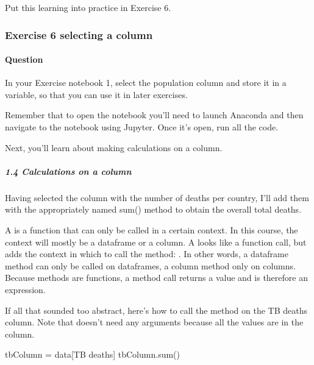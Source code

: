 \documentclass[letterpaper,10pt,english]{sphinxmanual}
\begin{document}
Put this learning into practice in Exercise 6.


\subsubsection{Exercise 6 selecting a column}
\label{\detokenize{content/session_02/Part_02_01:Exercise-6-selecting-a-column}}

\paragraph{Question}
\label{\detokenize{content/session_02/Part_02_01:id3}}
In your Exercise notebook 1, select the population column and store it in a variable, so that you can use it in later exercises.

Remember that to open the notebook you’ll need to launch Anaconda and then navigate to the notebook using Jupyter. Once it’s open, run all the code.

Next, you’ll learn about making calculations on a column.


\subparagraph{1.4 Calculations on a column}
\label{\detokenize{content/session_02/Part_02_01:1.4-Calculations-on-a-column}}
Having selected the column with the number of deaths per country, I’ll add them with the appropriately named sum() method to obtain the overall total deaths.

A  is a function that can only be called in a certain context. In this course, the context will mostly be a dataframe or a column. A  looks like a function call, but adds the context in which to call the method:  . In other words, a dataframe method can only be called on dataframes, a column method only on columns. Because methods are functions, a method call returns a value and is therefore an expression.

If all that sounded too abstract, here’s how to call the  method on the TB deaths column. Note that  doesn’t need any arguments because all the values are in the column.


{
\begin{sphinxVerbatim}[commandchars=\\\{\}]
\llap{\color{nbsphinxin}[ ]:\,\hspace{\fboxrule}\hspace{\fboxsep}}
tbColumn = data[\PYGZsq{}TB deaths\PYGZsq{}]
tbColumn.sum()
\end{sphinxVerbatim}
}
\end{document}
